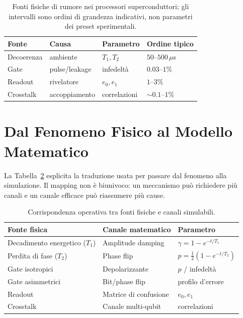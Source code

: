 \begin{onehalfspace}
\begin{table}[H]
\centering
\small
\begin{tabular}{@{}llll@{}}
\toprule
\textbf{Fonte} & \textbf{Causa} & \textbf{Parametro} & \textbf{Ordine tipico} \\
\midrule
Decoerenza & ambiente & $T_1,T_2$ & $50$--$500\,\mu$s \\
Gate & pulse/leakage & infedeltà & $0.03$--$1\%$ \\
Readout & rivelatore & $e_0,e_1$ & $1$--$3\%$ \\
Crosstalk & accoppiamento & correlazioni & $\sim0.1$--$1\%$ \\
\bottomrule
\end{tabular}
\caption{Fonti fisiche di rumore nei processori superconduttori; gli intervalli
sono ordini di grandezza indicativi, non parametri dei preset sperimentali.}
\label{tab:fonti_rumore}
\end{table}

\section{Dal Fenomeno Fisico al Modello Matematico}

La Tabella~\ref{tab:mapping_rumore} esplicita la traduzione usata per passare
dal fenomeno alla simulazione. Il mapping non è biunivoco: un meccanismo può
richiedere più canali e un canale efficace può riassumere più cause.

\begin{table}[H]
\centering
\small
\begin{tabular}{@{}lll@{}}
\toprule
\textbf{Fonte fisica} & \textbf{Canale matematico} & \textbf{Parametro} \\
\midrule
Decadimento energetico ($T_1$) & Amplitude damping & $\gamma=1-e^{-t/T_1}$ \\
Perdita di fase ($T_2$) & Phase flip & $p=\tfrac12(1-e^{-t/T_2})$ \\
Gate isotropici & Depolarizzante & $p$ / infedeltà \\
Gate asimmetrici & Bit/phase flip & profilo d'errore \\
Readout & Matrice di confusione & $e_0,e_1$ \\
Crosstalk & Canale multi-qubit & correlazioni \\
\bottomrule
\end{tabular}
\caption{Corrispondenza operativa tra fonti fisiche e canali simulabili.}
\label{tab:mapping_rumore}
\end{table}


\end{onehalfspace}
